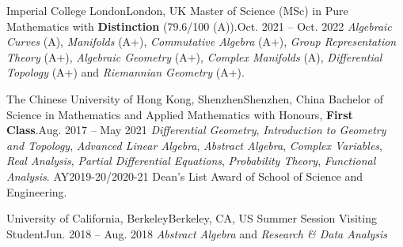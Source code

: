\HeadingItemListStart
	\HeadingItem
		{Imperial College London}{London, UK}
		{Master of Science (MSc) in Pure Mathematics with \textbf{Distinction} (79.6/100 (A)).}{Oct. 2021 -- Oct. 2022}
		\ItemListStart
				{\textit{Algebraic Curves} (A),
				\textit{Manifolds} (A+),
				\textit{Commutative Algebra} (A+),
				\textit{Group Representation Theory} (A+),
				\textit{Algebraic Geometry} (A+),
				\textit{Complex Manifolds} (A),
				\textit{Differential Topology} (A+)
				and \textit{Riemannian Geometry} (A+).}
		\ItemListEnd

	\HeadingItem
		{The Chinese University of Hong Kong, Shenzhen}{Shenzhen, China}
		{Bachelor of Science in Mathematics and Applied Mathematics with Honours, \textbf{First Class}.}{Aug. 2017 -- May 2021}
		\ItemListStart
				{\textit{Differential Geometry}, \textit{Introduction to Geometry and Topology}, \textit{Advanced Linear Algebra}, \textit{Abstract Algebra}, \textit{Complex Variables}, \textit{Real Analysis}, \textit{Partial Differential Equations}, \textit{Probability Theory}, \textit{Functional Analysis}.}
				{AY2019-20/2020-21 Dean's List Award of School of Science and Engineering.}
		\ItemListEnd

	\HeadingItem
		{University of California, Berkeley}{Berkeley, CA, US}
		{Summer Session Visiting Student}{Jun. 2018 -- Aug. 2018}
		\ItemListStart
				{\textit{Abstract Algebra} and \textit{Research \& Data Analysis}}
		\ItemListEnd


\HeadingItemListEnd